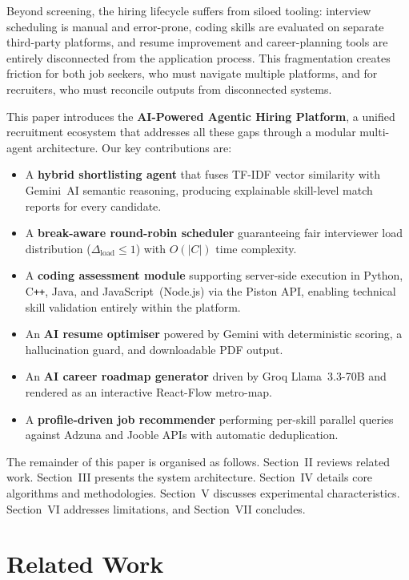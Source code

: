 \documentclass[conference]{IEEEtran}
\begin{document}
Beyond screening, the hiring lifecycle suffers from siloed tooling: interview scheduling is manual and error-prone, coding skills are evaluated on separate third-party platforms, and resume improvement and career-planning tools are entirely disconnected from the application process. This fragmentation creates friction for both job seekers, who must navigate multiple platforms, and for recruiters, who must reconcile outputs from disconnected systems.

This paper introduces the \textbf{AI-Powered Agentic Hiring Platform}, a unified recruitment ecosystem that addresses all these gaps through a modular multi-agent architecture. Our key contributions are:

\begin{itemize}
\item A \textbf{hybrid shortlisting agent} that fuses TF-IDF vector similarity with Gemini~AI semantic reasoning, producing explainable skill-level match reports for every candidate.
\item A \textbf{break-aware round-robin scheduler} guaranteeing fair interviewer load distribution ($\Delta_{\text{load}}\!\leq\!1$) with $O(|C|)$ time complexity.
\item A \textbf{coding assessment module} supporting server-side execution in Python, C\texttt{++}, Java, and JavaScript~(Node.js) via the Piston API, enabling technical skill validation entirely within the platform.
\item An \textbf{AI resume optimiser} powered by Gemini with deterministic scoring, a hallucination guard, and downloadable PDF output.
\item An \textbf{AI career roadmap generator} driven by Groq Llama~3.3-70B and rendered as an interactive React-Flow metro-map.
\item A \textbf{profile-driven job recommender} performing per-skill parallel queries against Adzuna and Jooble APIs with automatic deduplication.
\end{itemize}

The remainder of this paper is organised as follows. Section~II reviews related work. Section~III presents the system architecture. Section~IV details core algorithms and methodologies. Section~V discusses experimental characteristics. Section~VI addresses limitations, and Section~VII concludes.

\section{Related Work}
\end{document}
